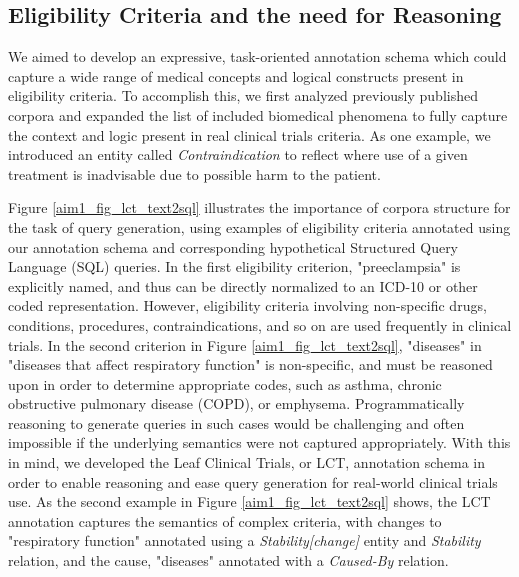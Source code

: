 \documentclass[../main.tex]{subfiles}
\begin{document}
\subsection{Eligibility Criteria and the need for Reasoning}

We aimed to develop an expressive, task-oriented annotation schema which could capture a wide range of medical concepts and logical constructs present in eligibility criteria. To accomplish this, we first analyzed previously published corpora \cite{weng2011elixr,boland2012elixrtime,kang2017eliie,kury2020chia} and expanded the list of included biomedical phenomena to fully capture the context and logic present in real clinical trials criteria. As one example, we introduced an entity called \textit{Contraindication} to reflect where use of a given treatment is inadvisable due to possible harm to the patient. 

Figure \ref{aim1_fig_lct_text2sql} illustrates the importance of corpora structure for the task of query generation, using examples of eligibility criteria annotated using our annotation schema and corresponding hypothetical Structured Query Language (SQL) queries. In the first eligibility criterion, "preeclampsia" is explicitly named, and thus can be directly normalized to an ICD-10 or other coded representation. However, eligibility criteria involving non-specific drugs, conditions, procedures, contraindications, and so on are used frequently in clinical trials. In the second criterion in Figure \ref{aim1_fig_lct_text2sql}, "diseases" in "diseases that affect respiratory function" is non-specific, and must be reasoned upon in order to determine appropriate codes, such as asthma, chronic obstructive pulmonary disease (COPD), or emphysema.  Programmatically reasoning to generate queries in such cases would be challenging and often impossible if the underlying semantics were not captured appropriately. With this in mind, we developed the Leaf Clinical Trials, or LCT, annotation schema in order to enable reasoning and ease query generation for real-world clinical trials use. As the second example in Figure \ref{aim1_fig_lct_text2sql} shows, the LCT annotation captures the semantics of complex criteria, with changes to "respiratory function" annotated using a \textit{Stability[change]} entity and \textit{Stability} relation, and the cause, "diseases" annotated with a \textit{Caused-By} relation.
\end{document}
